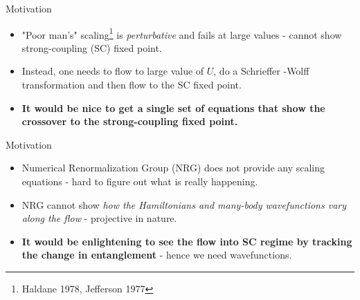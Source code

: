 \documentclass{beamer}
\begin{document}
\begin{frame}{Motivation}
  
\begin{itemize}
	\item "Poor man's" scaling\footnote{Haldane 1978, Jefferson 1977} is \textit{perturbative} and fails at large values - cannot show strong-coupling (SC) fixed point.
	\item Instead, one needs to flow to large value of \(U\), do a Schrieffer -Wolff transformation and then flow to the SC fixed point. 
	\item \textbf{It would be nice to get a single set of equations that show the crossover to the strong-coupling fixed point.}
\end{itemize}

\end{frame}


\begin{frame}{Motivation}

\begin{itemize}
	\item Numerical Renormalization Group (NRG) does not provide any scaling equations - hard to figure out what is really happening.
	\item NRG cannot show \textit{how the Hamiltonians and many-body wavefunctions vary along the flow} - projective in nature.
	\item \textbf{It would be enlightening to see the flow into SC regime by tracking the change in entanglement} - hence we need wavefunctions.
\end{itemize}

\end{frame}
\end{document}

